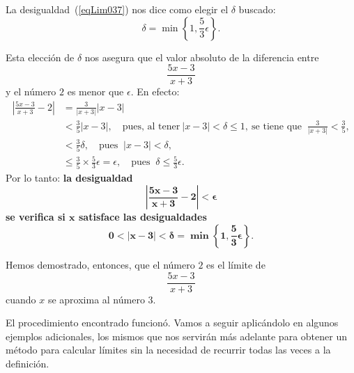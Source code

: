 \begin{exemplo}[Solución]
La desigualdad~(\ref{eqLim037}) nos dice como elegir el $\delta$ buscado:
\[
\delta = \min\left\{1,\frac{5}{3}\epsilon\right\}.
\]

Esta elección de $\delta$ nos asegura que el valor absoluto de la diferencia entre
\[
\frac{5x - 3}{x + 3}
\]
y el número $2$ es menor que $\epsilon$. En efecto:
\begin{align*}
\left|\frac{5x - 3}{x + 3} - 2\right| &= \frac{3}{|x + 3|}|x - 3| \\
& < \frac{3}{5}|x - 3|, \quad\text{pues, al tener}\ |x - 3| < \delta \leq 1, \ \text{se tiene que }\
   \frac{3}{|x + 3|} < \frac{3}{5}, \\
& < \frac{3}{5}\delta, \quad\text{pues }\ |x - 3| < \delta, \\
& \leq \frac{3}{5}\times\frac{5}{3}\epsilon = \epsilon, \quad\text{pues }\ \delta \leq \frac{5}{3}\epsilon.
\end{align*}
Por lo tanto: {\bfseries la desigualdad
\[
\bm{\left|\frac{5x - 3}{x + 3} - 2\right| < \epsilon}
\]
se verifica si $\bm{x}$ satisface las desigualdades
\[
\bm{0 < |x - 3| < \delta = \min\left\{1,\frac{5}{3}\epsilon\right\}}.
\]}

Hemos demostrado, entonces, que el número $2$ es el límite de
\[
\frac{5x - 3}{x + 3}
\]
cuando $x$ se aproxima al número $3$.
\end{exemplo}

El procedimiento encontrado funcionó. Vamos a seguir aplicándolo en algunos ejemplos adicionales,
los mismos que nos servirán más adelante para obtener un método para calcular límites sin la
necesidad de recurrir todas las veces a la definición.

